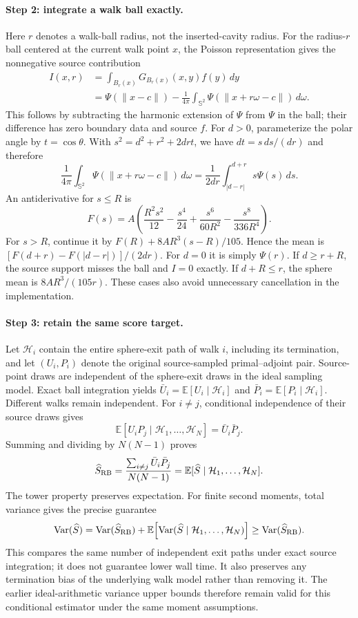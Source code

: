\paragraph{Step 2: integrate a walk ball exactly.}
Here $r$ denotes a walk-ball radius, not the inserted-cavity radius.
For the radius-$r$ ball centered at the current walk point $x$, the Poisson
representation gives the nonnegative source contribution
\[
 \begin{aligned}
 I(x,r)&=\int_{B_r(x)}G_{B_r(x)}(x,y)f(y)\,dy\\
       &=\Psi(\|x-c\|)-\frac1{4\pi}\int_{\mathbb S^2}\Psi(\|x+r\omega-c\|)\,d\omega.
 \end{aligned}
\]
This follows by subtracting the harmonic extension of $\Psi$ from $\Psi$
in the ball; their difference has zero boundary data and source $f$.
For $d>0$, parameterize the polar angle by $t=\cos\theta$. With
$s^2=d^2+r^2+2drt$, we have $dt=s\,ds/(dr)$ and therefore
\[
 \frac1{4\pi}\int_{\mathbb S^2}\Psi(\|x+r\omega-c\|)\,d\omega
 =\frac{1}{2dr}\int_{|d-r|}^{d+r}s\Psi(s)\,ds.
\]
An antiderivative for $s\leq R$ is
\[
 F(s)=A\left(\frac{R^2s^2}{12}-\frac{s^4}{24}
             +\frac{s^6}{60R^2}-\frac{s^8}{336R^4}\right).
\]
For $s>R$, continue it by $F(R)+8AR^3(s-R)/105$.
Hence the mean is $[F(d+r)-F(|d-r|)]/(2dr)$. For $d=0$ it is simply
$\Psi(r)$. If $d\geq r+R$, the source support misses the ball and $I=0$
exactly. If $d+R\leq r$, the sphere mean is $8AR^3/(105r)$.
These cases also avoid unnecessary cancellation in the implementation.

\paragraph{Step 3: retain the same score target.}
Let $\mathcal H_i$ contain the entire sphere-exit path of walk $i$, including
its termination, and let $(U_i,P_i)$ denote the original source-sampled
primal--adjoint pair. Source-point draws are independent of the sphere-exit
draws in the ideal sampling model. Exact ball integration yields
$\bar U_i=\mathbb E[U_i\mid\mathcal H_i]$ and
$\bar P_i=\mathbb E[P_i\mid\mathcal H_i]$. Different walks remain independent.
For $i\ne j$, conditional independence of their source draws gives
\[
 \mathbb E[U_iP_j\mid\mathcal H_1,\ldots,\mathcal H_N]
 =\bar U_i\bar P_j.
\]
Summing and dividing by $N(N-1)$ proves
\[
 \widehat S_{\rm RB}
 =\frac{\sum_{i\ne j}\bar U_i\bar P_j}{N(N-1)}
 =\mathbb E[\widehat S\mid\mathcal H_1,\ldots,\mathcal H_N].
\]
The tower property preserves expectation. For finite second moments, total
variance gives the precise guarantee
\[
 \operatorname{Var}(\widehat S)
 =\operatorname{Var}(\widehat S_{\rm RB})
  +\mathbb E\!\left[\operatorname{Var}(\widehat S\mid
                \mathcal H_1,\ldots,\mathcal H_N)\right]
 \geq\operatorname{Var}(\widehat S_{\rm RB}).
\]
This compares the same number of independent exit paths under exact source
integration; it does not guarantee lower wall time. It also preserves any
termination bias of the underlying walk model rather than removing it.
The earlier ideal-arithmetic variance upper bounds therefore remain valid
for this conditional estimator under the same moment assumptions.

